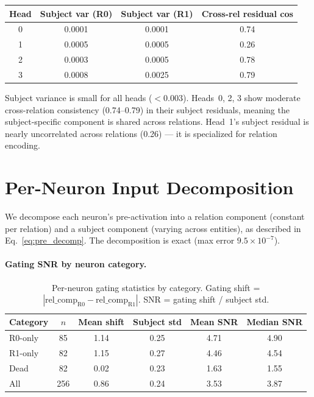 \documentclass[11pt,a4paper]{article}
\begin{document}
\begin{center}
\begin{tabular}{cccc}
\toprule
Head & Subject var (R0) & Subject var (R1) & Cross-rel residual cos \\
\midrule
0 & 0.0001 & 0.0001 & 0.74 \\
1 & 0.0005 & 0.0005 & 0.26 \\
2 & 0.0003 & 0.0005 & 0.78 \\
3 & 0.0008 & 0.0025 & 0.79 \\
\bottomrule
\end{tabular}
\end{center}

\noindent Subject variance is small for all heads ($< 0.003$).
Heads~0, 2, 3 show moderate cross-relation consistency (0.74--0.79) in
their subject residuals, meaning the subject-specific component is
shared across relations. Head~1's subject residual is nearly
uncorrelated across relations (0.26) --- it is specialized for
relation encoding.

\section{Per-Neuron Input Decomposition}
\label{app:neuron_decomp}

We decompose each neuron's pre-activation into a relation component
(constant per relation) and a subject component (varying across
entities), as described in Eq.~\eqref{eq:pre_decomp}. The
decomposition is exact (max error $9.5 \times 10^{-7}$).

\paragraph{Gating SNR by neuron category.}

\begin{table}[h]
\centering
\caption{Per-neuron gating statistics by category. Gating shift =
  $|\text{rel\_comp}_{\text{R0}} - \text{rel\_comp}_{\text{R1}}|$.
  SNR = gating shift / subject std.}
\label{tab:gating_snr}
\begin{tabular}{lccccc}
\toprule
Category & $n$ & Mean shift & Subject std & Mean SNR & Median SNR \\
\midrule
R0-only & 85 & 1.14 & 0.25 & 4.71 & 4.90 \\
R1-only & 82 & 1.15 & 0.27 & 4.46 & 4.54 \\
Dead & 82 & 0.02 & 0.23 & 1.63 & 1.55 \\
\midrule
All & 256 & 0.86 & 0.24 & 3.53 & 3.87 \\
\bottomrule
\end{tabular}
\end{table}
\end{document}

